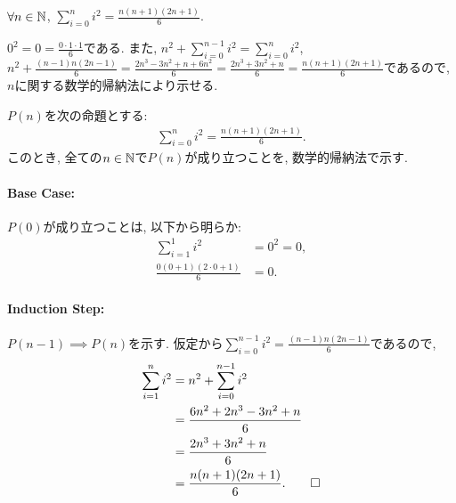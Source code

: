 \begin{prop}
  $\forall n\in\mathbb{N}$, $\sum_{i=0}^{n}i^2=\frac{n(n+1)(2n+1)}{6}$.
\end{prop}
\begin{proof**}
  $0^2=0=\frac{0\cdot 1\cdot 1}{6}$である.
  また,
  $n^2+\sum_{i=0}^{n-1}i^2=\sum_{i=0}^{n}i^2$,
  $n^2+\frac{(n-1)n(2n-1)}{6}=\frac{2n^3-3n^2+n+6n^2}{6}=\frac{2n^3+3n^2+n}{6}=\frac{n(n+1)(2n+1)}{6}$であるので,
  $n$に関する数学的帰納法により示せる.
\end{proof**}


\begin{proof*}
  $P(n)$を次の命題とする:
  \begin{align*}
    \sum_{i=0}^{n}i^2=\frac{n(n+1)(2n+1)}{6}.
  \end{align*}
  このとき,
  全ての$n\in\mathbb{N}$で$P(n)$が成り立つことを,
  数学的帰納法で示す.

  \paragraph{Base Case:}
  $P(0)$が成り立つことは, 以下から明らか:
  \begin{align*}
    \sum_{i=1}^{1}i^2&=0^2=0,\\
    \frac{0(0+1)(2\cdot 0+1)}{6}&=0.
  \end{align*}

  \paragraph{Induction Step:}
  $P(n-1)\implies P(n)$を示す.
  仮定から$\sum_{i=0}^{n-1}i^2=\frac{(n-1)n(2n-1)}{6}$であるので,
  \begin{align*}
    \sum_{i=1}^{n}i^2&=n^2+\sum_{i=0}^{n-1}i^2\\
    &=\frac{6n^2+2n^3-3n^2+n}{6}\\
    &=\frac{2n^3+3n^2+n}{6}\\
    &=\frac{n(n+1)(2n+1)}{6}
    .\qedhere
  \end{align*}
\end{proof*}


